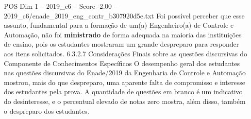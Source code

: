 \begin{textsample}{POS Dim 1 – 2019\_c6 – Score -2.00 – 2019\_c6/enade\_2019\_eng\_contr\_b307920d5e.txt}
Foi possível perceber que esse assunto, fundamental para a formação de um(a) Engenheiro(a) de Controle e Automação, não foi \textbf{ministrado} de forma adequada na maioria das instituições de ensino, pois os estudantes mostraram um grande despreparo para responder aos itens solicitados. 6.3.2.7 Considerações Finais sobre as questões discursivas do Componente de Conhecimentos Específicos O desempenho geral dos estudantes nas questões discursivas do Enade/2019 da Engenharia de Controle e Automação mostrou, mais do que despreparo, uma aparente falta de compromisso e interesse dos estudantes pela prova.
A quantidade de questões em branco é um indicativo do desinteresse, e o percentual elevado de notas zero mostra, além disso, também o despreparo dos estudantes.

\end{textsample}
